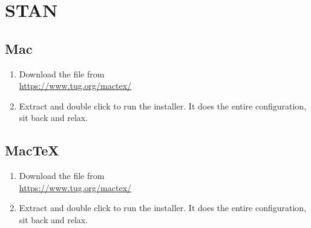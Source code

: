 \section*{STAN}

\subsection*{Mac}

\begin{enumerate}
	\item	Download the file from\\
	\href{https://www.tug.org/mactex/}{https://www.tug.org/mactex/}
	\item	Extract and double click to run the installer. It does the entire configuration, sit back and relax.
\end{enumerate}
\subsection*{MacTeX}
\begin{enumerate}
	\item	Download the file from\\
	\href{https://www.tug.org/mactex/}{https://www.tug.org/mactex/}
	\item	Extract and double click to run the installer. It does the entire configuration, sit back and relax.
\end{enumerate}

